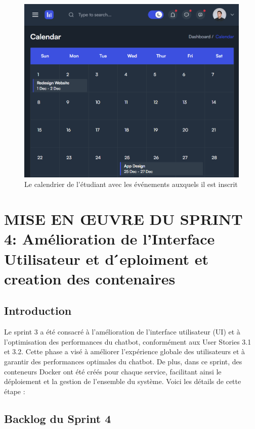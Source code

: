 \documentclass[a4paper, 11pt, openany]{report}
\begin{document}
\begin{figure}
\centering
\includegraphics[width=\textwidth]{calendar.png} 
\caption{Le calendrier de l'étudiant avec les événements auxquels il est inscrit}
\label{fig:calender}
\end{figure}



\clearpage

\chapter{MISE EN ŒUVRE DU SPRINT 4: Amélioration de l’Interface Utilisateur et  d ́eploiment et creation des contenaires}


\section{Introduction}
Le sprint 3 a été consacré à l'amélioration de l'interface utilisateur (UI) et à l'optimisation des performances du chatbot, conformément aux User Stories 3.1 et 3.2. Cette phase a visé à améliorer l'expérience globale des utilisateurs et à garantir des performances optimales du chatbot. De plus, dans ce sprint, des conteneurs Docker ont été créés pour chaque service, facilitant ainsi le déploiement et la gestion de l'ensemble du système. Voici les détails de cette étape :


\section{Backlog du Sprint 4}
\end{document}
